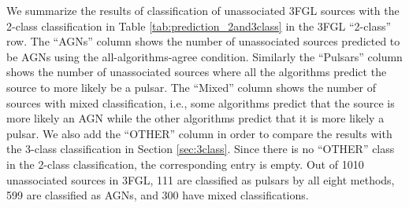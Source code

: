 \begin{table}[!h]
\centering
{}
    \vspace{2mm}
    \caption{Expected number of AGNs, pulsars, and other sources as well as sources with mixed classifications
    among the unassociated 3FGL and 4FGL-DR2 sources derived with the 2-class (Section \ref{sec:prob_cats}) 
    and 3-class (Section \ref{sec:3class}) classification.
    The ``2-class corr'' row shows correction of the 2-class classification prediction due to the presence of OTHER sources among 
    the unassociated ones (see Section \ref{sec:3FGLprediction1} for details).}
    \label{tab:prediction_2and3class}
\end{table}



We summarize the results of classification of unassociated 3FGL sources with the 2-class classification 
in Table \ref{tab:prediction_2and3class} in the 3FGL ``2-class'' row.
The ``AGNs'' column shows the number of unassociated sources predicted to be AGNs using the all-algorithms-agree condition.
Similarly the ``Pulsars'' column shows the number of unassociated sources where all the algorithms predict the source to more likely be a pulsar.
The ``Mixed'' column shows the number of sources with mixed classification, i.e., some algorithms predict that the source is more likely an AGN while the other algorithms predict that it is more likely a pulsar.
We also add the ``OTHER'' column in order to compare the results with the 3-class classification in Section \ref{sec:3class}.
Since there is no ``OTHER'' class in the 2-class classification, the corresponding entry is empty.
Out of 1010 unassociated sources in 3FGL, 111 are classified as pulsars by all eight methods, 599 are classified as AGNs, and 300 have mixed classifications.



